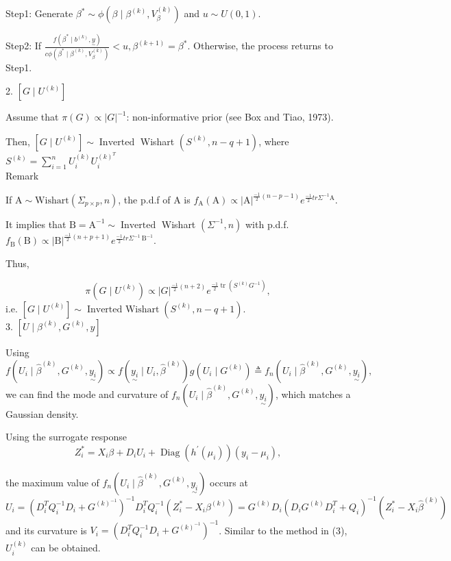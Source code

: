\documentclass[UTF8,a4paper,10pt]{article}
\begin{document}
Step1: Generate $\beta^{*} \sim \phi\left(\beta \mid \beta^{(k)}, V_{\beta}^{(k)}\right)$ and $u \sim U(0,1)$.

Step2: If $\frac{f\left(\beta^{*} \mid b^{(k)}, \underset{\sim}{y}\right)}{c \phi\left(\beta^{*} \mid \beta^{(k)}, V_{\beta}^{(k)}\right)}<u, \beta^{(k+1)}=\beta^{*}$. Otherwise, the process returns to Step1.

2. $\left[G \mid U^{(k)}\right]$

Assume that $\pi(G) \propto|G|^{-1}$: non-informative prior (see Box and Tiao, 1973). 

Then, $\left[G \mid U^{(k)}\right] \sim \operatorname{Inverted}$ Wishart $\left(S^{(k)}, n-q+1\right)$, where $S^{(k)}=\sum_{i=1}^{n} U_{i}^{(k)} U_{i}^{(k)^{T}}$
\\

Remark

If $\mathrm{A} \sim \mathrm{Wishart}\left(\Sigma_{p \times p}, n\right)$, the p.d.f of $\mathrm{A} $ is $f_{\mathrm{A}}(\mathrm{A}) \propto|\mathrm{A}|^{\frac{-1}{2}(n-p-1)} e^{\frac{-1}{2} tr \Sigma^{-1} \mathrm{A}}$. 

It implies that $\mathrm{B}=\mathrm{A}^{-1} \sim \operatorname{Inverted}$ Wishart $\left(\Sigma^{-1}, n\right)$ with p.d.f. $f_{\mathrm{B}}(\mathrm{B}) \propto|\mathrm{B}|^{\frac{-1}{2}(n+p+1)} e^{\frac{-1}{2} t r \Sigma^{-1} \mathrm{~B}^{-1}}$. 

Thus, 

\[\pi\left(G \mid U^{(k)}\right) \propto|G|^{\frac{-1}{2}(n+2)} e^{\frac{-1}{2} \operatorname{tr}\left(S^{(k)} G^{-1}\right)},\] 
i.e. $\left[G \mid U^{(k)}\right] \sim \operatorname{Inverted~Wishart}\left(S^{(k)}, n-q+1\right)$.
\\

3. $\left[U \mid \beta^{(k)}, G^{(k)}, y\right]$

Using 
\[f\left(U_{i} \mid \hat{\beta}^{(k)}, G^{(k)},\underset{\sim}{y_{i}}\right) \propto f\left(\underset{\sim}{y_{i}} \mid U_{i}, \hat{\beta}^{(k)}\right) g\left(U_{i} \mid G^{(k)}\right) \triangleq f_{n}\left(U_{i} \mid \hat{\beta}^{(k)}, G^{(k)},\underset{\sim}{y_{i}}\right),\] 
we can find the mode and curvature of $f_{n}\left(U_{i} \mid \hat{\beta}^{(k)}, G^{(k)},\underset{\sim}{y_{i}}\right)$, which matches a Gaussian density.

Using the surrogate response \[Z_{i}^{*}=X_{i} \beta+D_{i} U_{i}+\operatorname{Diag}\left(h^{\prime}\left(\mu_{i}\right)\right)\left(y_{i}-\mu_{i}\right),\] 

the maximum value of $f_{n}\left(U_{i} \mid \hat{\beta}^{(k)}, G^{(k)}, \underset{\sim}{y_{i}}\right)$ occurs at 
\[U_{i}=\left(D_{i}^{T} Q_{i}^{-1} D_{i}+G^{(k)^{-1}}\right)^{-1} D_{i}^{T} Q_{i}^{-1}\left(Z_{i}^{*}-X_{i} \beta^{(k)}\right)=G^{(k)} D_{i}\left(D_{i} G^{(k)} D_{i}^{T}+Q_{i}\right)^{-1}\left(Z_{i}^{*}-X_{i} \hat{\beta}^{(k)}\right)\]
and its curvature is $V_{i}=\left(D_{i}^{T} Q_{i}^{-1} D_{i}+G^{(k)^{-1}}\right)^{-1}$. Similar to the method in (3), $U_{i}^{(k)}$ can be obtained.
\end{document}
